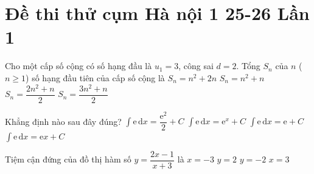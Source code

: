\section*{Đề thi thử cụm Hà nội 1 25-26 Lần 1}
\caulc
\begin{ex}%
	Cho một cấp số cộng có số hạng đầu là $u_1=3$, công sai $d=2$. Tổng $S_n$ của $n$ ($n\geq 1$) số hạng đầu tiên của cấp số cộng là
	\choice
	{\True $S_n=n^2+2n$}
	{$S_n=n^2+n$}
	{$S_n=\dfrac{2n^2+n}{2}$}
	{$S_n=\dfrac{3n^2+n}{2}$}
\end{ex}
\begin{ex}%
	Khẳng định nào sau đây đúng?
	\choice
	{$\displaystyle\int \mathrm{e}\mathrm{\,d}x=\dfrac{\mathrm{e}^2}{2}+C$}
	{$\displaystyle\int \mathrm{e}\mathrm{\,d}x=\mathrm{e}^x+C$}
	{$\displaystyle\int \mathrm{e}\mathrm{\,d}x=\mathrm{e}+C$}
	{\True $\displaystyle\int \mathrm{e}\mathrm{\,d}x=\mathrm{e}x+C$}
\end{ex}
\begin{ex}%
	Tiệm cận đứng của đồ thị hàm số $y=\dfrac{2x-1}{x+3}$ là
	\choice
	{\True $x=-3$}
	{$y=2$}
	{$y=-2$}
	{$x=3$}
\end{ex}
